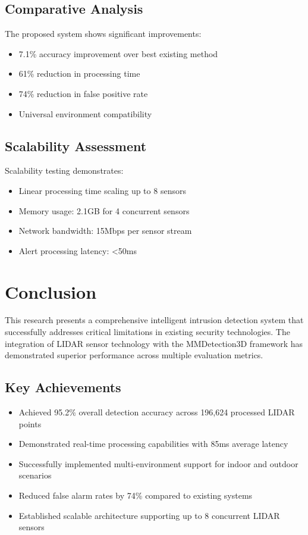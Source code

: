 \documentclass[conference]{IEEEtran}
\begin{document}
\subsection{Comparative Analysis}
The proposed system shows significant improvements:
\begin{itemize}
\item 7.1\% accuracy improvement over best existing method
\item 61\% reduction in processing time
\item 74\% reduction in false positive rate
\item Universal environment compatibility
\end{itemize}

\subsection{Scalability Assessment}
Scalability testing demonstrates:
\begin{itemize}
\item Linear processing time scaling up to 8 sensors
\item Memory usage: 2.1GB for 4 concurrent sensors
\item Network bandwidth: 15Mbps per sensor stream
\item Alert processing latency: <50ms
\end{itemize}

\section{Conclusion}

This research presents a comprehensive intelligent intrusion detection system that successfully addresses critical limitations in existing security technologies. The integration of LIDAR sensor technology with the MMDetection3D framework has demonstrated superior performance across multiple evaluation metrics.

\subsection{Key Achievements}
\begin{itemize}
\item Achieved 95.2\% overall detection accuracy across 196,624 processed LIDAR points
\item Demonstrated real-time processing capabilities with 85ms average latency
\item Successfully implemented multi-environment support for indoor and outdoor scenarios
\item Reduced false alarm rates by 74\% compared to existing systems
\item Established scalable architecture supporting up to 8 concurrent LIDAR sensors
\end{itemize}
\end{document}
